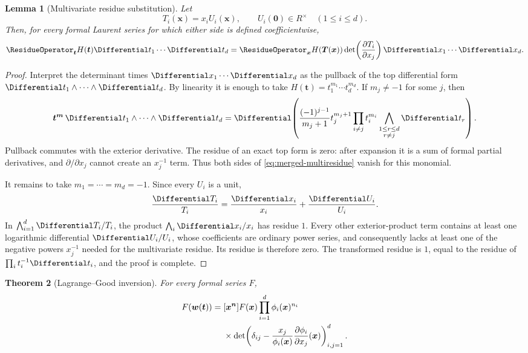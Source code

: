 \documentclass[11pt,a4paper,oneside,openany]{book}
\newtheorem{theorem}{Theorem}[chapter]
\newtheorem{lemma}[theorem]{Lemma}
\theoremstyle{definition}
\theoremstyle{remark}
\begin{document}
\begin{lemma}[Multivariate residue substitution]
\label{lem:merged-multiresidue}
Let
\[
 T_i(\bm x)=x_iU_i(\bm x),\qquad U_i(\bm0)\in R^\times\quad(1\leq i\leq d).
\]
Then, for every formal Laurent series for which either side is defined
coefficientwise,
\begin{equation}
 \ResidueOperator_{\bm t}H(\bm t)\Differential t_1\cdots\Differential t_d
 =\ResidueOperator_{\bm x}H(\bm T(\bm x))
   \det\!\left(\frac{\partial T_i}{\partial x_j}\right)
   \Differential x_1\cdots\Differential x_d.                                          \label{eq:merged-multiresidue}
\end{equation}
\end{lemma}

\begin{proof}
Interpret the determinant times $\Differential x_1\cdots\Differential x_d$ as the pullback of
the top differential form $\Differential t_1\wedge\cdots\wedge\Differential t_d$.  By linearity
it is enough to take
$H(\bm t)=t_1^{m_1}\cdots t_d^{m_d}$.  If $m_j\ne-1$ for some $j$, then
\[
 \bm t^{\bm m}\,\Differential t_1\wedge\cdots\wedge\Differential t_d
 =\Differential\!\left(
   \frac{(-1)^{j-1}}{m_j+1}
   t_j^{m_j+1}\prod_{i\ne j}t_i^{m_i}
   \bigwedge_{\substack{1\le r\le d\\ r\ne j}}\Differential t_r\right).
\]
Pullback commutes with the exterior derivative.  The residue of an exact top
form is zero: after expansion it is a sum of formal partial derivatives, and
$\partial/\partial x_j$ cannot create an $x_j^{-1}$ term.  Thus both sides of
\eqref{eq:merged-multiresidue} vanish for this monomial.

It remains to take $m_1=\cdots=m_d=-1$.  Since every $U_i$ is a unit,
\[
 \frac{\Differential T_i}{T_i}=\frac{\Differential x_i}{x_i}+\frac{\Differential U_i}{U_i}.
\]
In
$\bigwedge_{i=1}^{d}\Differential T_i/T_i$, the product
$\bigwedge_i\Differential x_i/x_i$ has residue $1$.  Every other exterior-product term
contains at least one logarithmic differential $\Differential U_i/U_i$, whose
coefficients are ordinary power series, and consequently lacks at least one
of the negative powers $x_j^{-1}$ needed for the multivariate residue.  Its
residue is therefore zero.  The transformed residue is $1$, equal to the
residue of $\prod_i t_i^{-1}\Differential t_i$, and the proof is complete.
\end{proof}

\begin{theorem}[Lagrange--Good inversion]
\label{thm:merged-good}
For every formal series $F$,
\begin{align}
 [\bm t^{\bm n}]F(\bm w(\bm t))
 ={}&[\bm x^{\bm n}]F(\bm x)\prod_{i=1}^{d}\phi_i(\bm x)^{n_i}       \notag\\
 &\times\det\!\left(
 \delta_{ij}-\frac{x_j}{\phi_i(\bm x)}
                  \frac{\partial\phi_i}{\partial x_j}(\bm x)
 \right)_{i,j=1}^{d}.                                               \label{eq:merged-good}
\end{align}
\end{theorem}
\end{document}
